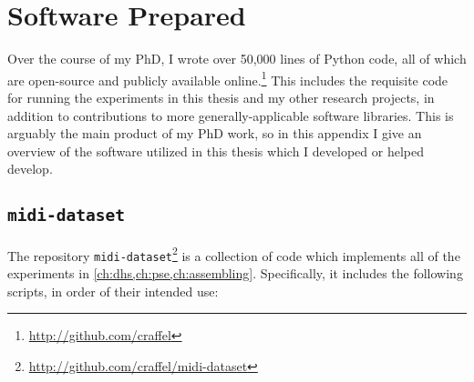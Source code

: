 \chapter{Software Prepared}

Over the course of my PhD, I wrote over 50,000 lines of Python code, all of which are open-source and publicly available online.\footnote{\url{http://github.com/craffel}}
This includes the requisite code for running the experiments in this thesis and my other research projects, in addition to contributions to more generally-applicable software libraries.
This is arguably the main product of my PhD work, so in this appendix I give an overview of the software utilized in this thesis which I developed or helped develop.

\section{\texttt{midi-dataset}}

The repository \texttt{midi-dataset}\footnote{\url{http://github.com/craffel/midi-dataset}} is a collection of code which implements all of the experiments in \cref{ch:dhs,ch:pse,ch:assembling}.
Specifically, it includes the following scripts, in order of their intended use:

